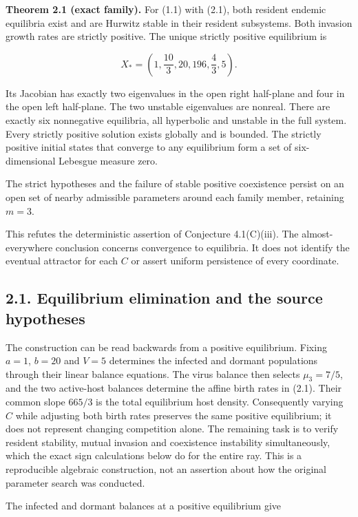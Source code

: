 \documentclass[
  11pt,
]{article}
\begin{document}
\textbf{Theorem 2.1 (exact family).} For (1.1) with (2.1), both resident
endemic equilibria exist and are Hurwitz stable in their resident
subsystems. Both invasion growth rates are strictly positive. The unique
strictly positive equilibrium is

\[
X_*=\left(1,\frac{10}{3},20,196,\frac43,5\right). \tag{2.2}
\]

Its Jacobian has exactly two eigenvalues in the open right half-plane
and four in the open left half-plane. The two unstable eigenvalues are
nonreal. There are exactly six nonnegative equilibria, all hyperbolic
and unstable in the full system. Every strictly positive solution exists
globally and is bounded. The strictly positive initial states that
converge to any equilibrium form a set of six-dimensional Lebesgue
measure zero.

The strict hypotheses and the failure of stable positive coexistence
persist on an open set of nearby admissible parameters around each
family member, retaining \(m=3\).

This refutes the deterministic assertion of Conjecture 4.1(C)(iii). The
almost-everywhere conclusion concerns convergence to equilibria. It does
not identify the eventual attractor for each \(C\) or assert uniform
persistence of every coordinate.

\subsection{2.1. Equilibrium elimination and the source
hypotheses}\label{equilibrium-elimination-and-the-source-hypotheses}

The construction can be read backwards from a positive equilibrium.
Fixing \(a=1\), \(b=20\) and \(V=5\) determines the infected and dormant
populations through their linear balance equations. The virus balance
then selects \(\mu_3=7/5\), and the two active-host balances determine
the affine birth rates in (2.1). Their common slope \(665/3\) is the
total equilibrium host density. Consequently varying \(C\) while
adjusting both birth rates preserves the same positive equilibrium; it
does not represent changing competition alone. The remaining task is to
verify resident stability, mutual invasion and coexistence instability
simultaneously, which the exact sign calculations below do for the
entire ray. This is a reproducible algebraic construction, not an
assertion about how the original parameter search was conducted.

The infected and dormant balances at a positive equilibrium give
\end{document}
